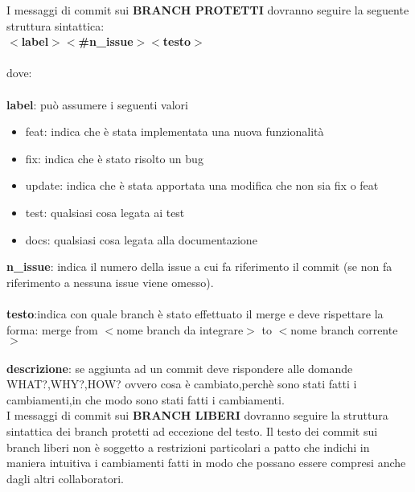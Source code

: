 I messaggi di commit sui \textbf{\uppercase{branch protetti}} dovranno seguire la seguente struttura sintattica:\\

\textbf{$<$label$>$$<$\#n\_issue$>$$<$testo$>$}\\\\
dove:\\\\
\textbf{label}: può assumere i seguenti valori
\begin{itemize}
\item feat: indica che è stata implementata una nuova funzionalità
\item fix: indica che è stato risolto un bug
\item update: indica che è stata apportata una modifica che non sia fix o feat
\item test: qualsiasi cosa legata ai test
\item docs: qualsiasi cosa legata alla documentazione
\end{itemize}
\textbf{n\_issue}: indica il numero della issue a cui fa riferimento il commit (se non fa riferimento a nessuna issue viene omesso).\\\\
\textbf{testo}:indica con quale branch è stato effettuato il merge e deve rispettare la forma: merge from $<$nome branch da integrare$>$ to $<$nome branch corrente$>$ \\\\
\textbf{descrizione}: se aggiunta ad un commit deve rispondere alle domande WHAT?,WHY?,HOW? ovvero
cosa è cambiato,perchè sono stati fatti i cambiamenti,in che modo sono stati fatti i cambiamenti.\\

I messaggi di commit sui \textbf{\uppercase{branch liberi}} dovranno seguire la struttura sintattica dei branch protetti ad eccezione del testo.
Il testo dei commit sui branch liberi non è soggetto a restrizioni particolari a patto che indichi in maniera intuitiva i cambiamenti fatti
in modo che possano essere compresi anche dagli altri collaboratori.



